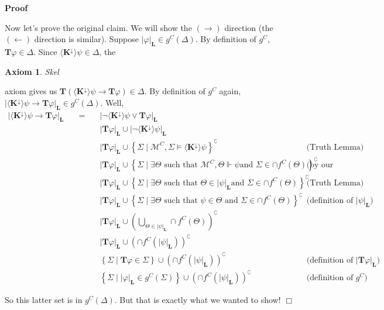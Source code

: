 \documentclass{article}
\newcommand{\tmmathbf}[1]{\ensuremath{\boldsymbol{#1}}}
\newenvironment{proof}{\noindent\textbf{Proof\ }}{\hspace*{\fill}$\Box$\medskip}
\newtheorem{axiom}{Axiom}
\newcommand{\Model}{\ensuremath{\mathcal{M}}}
\newcommand{\Logic}{\ensuremath{\tmmathbf{\text{L}}}}
\newcommand{\diaKnownby}{\langle \tmmathbf{\text{K}^{\downarrow}} \rangle}
\newcommand{\Typ}{\ensuremath{\tmmathbf{\text{T}}}}
\begin{document}
\begin{proof}
\begin{description}
    Now let's prove the original claim. We will show the $(\rightarrow)$
    direction (the $(\leftarrow)$ direction is similar). Suppose $| \varphi
    |_{\Logic} \in g^C (\Delta)$. By definition of $g^C$, $\Typ \varphi \in
    \Delta$. Since $\diaKnownby \psi \in \Delta$, the \begin{axiom}
      Skel
    \end{axiom} axiom gives us $\Typ \left( \diaKnownby \psi \rightarrow \Typ
    \varphi \right) \in \Delta$. By definition of $g^C$ again, $\left|
    \diaKnownby \psi \rightarrow \Typ \varphi \right|_{\Logic} \in g^C
    (\Delta)$. Well,
    \[ \begin{array}{llll}
         \left| \diaKnownby \psi \rightarrow \Typ \varphi \right|_{\Logic} &
         \quad = \quad & \left| \neg \diaKnownby \psi \vee \Typ \varphi
         \right|_{\Logic} & \\
         &  & \left| \Typ \varphi \right|_{\Logic} \cup \left| \neg
         \diaKnownby \psi \right|_{\Logic} & \\
         &  & \left| \Typ \varphi \right|_{\Logic} \cup \left\{ \Sigma \mid
         \Model^C, \Sigma \models \diaKnownby \psi \right\}^{\complement} &
         \text{(Truth Lemma)}\\
         &  & \left| \Typ \varphi \right|_{\Logic} \cup \left\{ \Sigma \mid
         \exists \Theta \text{ such that } \Model^C, \Theta \Vdash \psi \text{
         and } \Sigma \in \cap f^C (\Theta) \right\}^{\complement} & \text{(by
         our semantics)}\\
         &  & \left| \Typ \varphi \right|_{\Logic} \cup \left\{ \Sigma \mid
         \exists \Theta \text{ such that } \Theta \in | \psi |_{\Logic} \text{
         and } \Sigma \in \cap f^C (\Theta) \right\}^{\complement} &
         \text{(Truth Lemma)}\\
         &  & \left| \Typ \varphi \right|_{\Logic} \cup \left\{ \Sigma \mid
         \exists \Theta \text{ such that } \psi \in \Theta \text{ and } \Sigma
         \in \cap f^C (\Theta) \right\}^{\complement} & \text{(definition of
         $| \psi |_{\Logic}$)}\\
         &  & \left| \Typ \varphi \right|_{\Logic} \cup \left(
         \bigcup_{\Theta \in | \psi |_{\Logic}} \cap f^C (\Theta)
         \right)^{\complement} & \\
         &  & \left| \Typ \varphi \right|_{\Logic} \cup \left( \cap f^C
         \left( | \psi |_{\Logic} \right) \right)^{\complement} & \\
         &  & \left\{ \Sigma \mid \Typ \varphi \in \Sigma \right\} \cup
         \left( \cap f^C \left( | \psi |_{\Logic} \right)
         \right)^{\complement} & \text{(definition of $\left| \Typ \varphi
         \right|_{\Logic}$)}\\
         &  & \left\{ \Sigma \mid | \varphi |_{\Logic} \in g^C (\Sigma)
         \right\} \cup \left( \cap f^C \left( | \psi |_{\Logic} \right)
         \right)^{\complement} & \text{(definition of $g^C$)}
       \end{array} \]
  \end{description}
  So this latter set is in $g^C (\Delta)$. But that is exactly what we wanted
  to show!
\end{proof}
\end{document}
